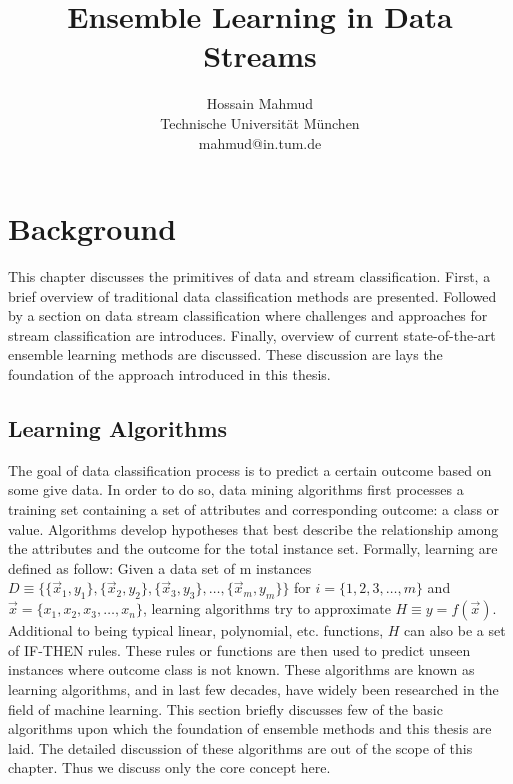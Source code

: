 \documentclass[a4paper, 11pt, oneside]{book}
\begin{document}
\title{Ensemble Learning in Data Streams}


\author{
Hossain Mahmud \\
Technische Universit\"at M\"unchen\\
mahmud@in.tum.de
}

\date{}

%
%
%

\onehalfspacing
{}
\setcounter{page}{1}



\chapter{Background}
\label{chp:background}
This chapter discusses the primitives of data and stream classification. First, a brief overview of traditional data classification methods are presented. Followed by a section on data stream classification where challenges and approaches for stream classification are introduces. Finally, overview of current state-of-the-art ensemble learning methods are discussed. These discussion are lays the foundation of the approach introduced in this thesis.

\section{Learning Algorithms}
The goal of data classification process is to predict a certain outcome based on some give data. In order to do so, data mining algorithms first processes a training set containing a set of attributes and corresponding outcome: a class or value. Algorithms develop hypotheses that best describe the relationship among the attributes and the outcome for the total instance set. 
Formally, learning are defined as follow: Given a data set of m instances 
$D \equiv \{ \{\vec{x}_1, y_1\}, \{\vec{x}_2, y_2\}, \{\vec{x}_3, y_3\}, \dots, \{\vec{x}_m, y_m\} \}$ 
for $i = \{ 1, 2, 3, \dots, m \}$ and $ \vec{x} = \{x_1, x_2, x_3, \dots, x_n\}$, 
learning algorithms try to approximate $H \equiv y = f(\vec{x})$. 
Additional to being typical linear, polynomial, etc. functions, $H$ can also be a set of IF-THEN rules. 
These rules or functions are then used to predict unseen instances where outcome class is not known. These algorithms are known as learning algorithms, and in last few decades, have widely been researched in the field of machine learning. This section briefly discusses few of the basic algorithms upon which the foundation of ensemble methods and this thesis are laid. The detailed discussion of these algorithms are out of the scope of this chapter. Thus we discuss only the core concept here.
\end{document}
